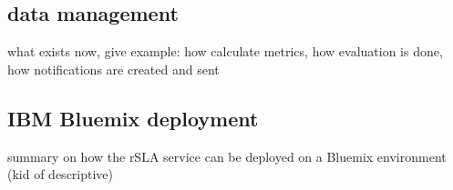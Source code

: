 \documentclass{llncs}
\begin{document}
\subsection{data management}
what exists now, give example: how calculate metrics, how evaluation is done, how notifications are created and sent
\subsection{IBM Bluemix deployment}
summary on how the rSLA service can be deployed on a Bluemix environment (kid of descriptive)






\end{document}

